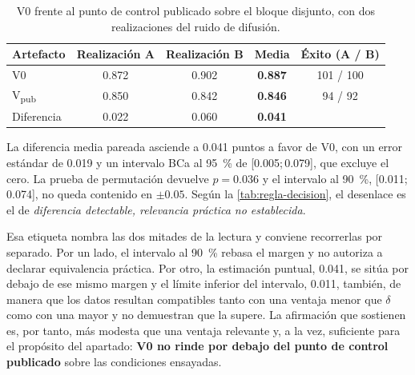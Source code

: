 \begin{table}[htbp]
  \centering
  \caption{V0 frente al punto de control publicado sobre el bloque disjunto, con dos
    realizaciones del ruido de difusi\'on.}
  \label{tab:comparacion-paper}
  \small
  \scriptsize
  \begin{tabular}{lccc c}
    \toprule
    Artefacto & Realizaci\'on A & Realizaci\'on B & Media & \'Exito (A / B) \\
    \midrule
    V0                  & \num{0.872} & \num{0.902} & \textbf{\num{0.887}} &
      \num{101} / \num{100} \\
    V\textsubscript{pub} & \num{0.850} & \num{0.842} & \textbf{\num{0.846}} &
      \num{94} / \num{92} \\
    \midrule
    Diferencia & \num{0.022} & \num{0.060} & \textbf{\num{0.041}} & \\
    \bottomrule
  \end{tabular}
\end{table}

La diferencia media pareada asciende a \num{0.041} puntos a favor de V0, con un error
est\'andar de \num{0.019} y un intervalo BCa al \SI{95}{\percent} de
{[\num{0.005};\,\num{0.079}]}, que excluye el cero. La prueba de permutaci\'on devuelve
$p = \num{0.036}$ y el intervalo al \SI{90}{\percent}, {[\num{0.011};\,\num{0.074}]}, no
queda contenido en $\pm\num{0.05}$. Seg\'un la \cref{tab:regla-decision}, el desenlace es el
de \emph{diferencia detectable, relevancia pr\'actica no establecida}.

Esa etiqueta nombra las dos mitades de la lectura y conviene recorrerlas por separado. Por un
lado, el intervalo al \SI{90}{\percent} rebasa el margen y no autoriza a declarar
equivalencia pr\'actica. Por otro, la estimaci\'on puntual, \num{0.041}, se sit\'ua por
debajo de ese mismo margen y el l\'imite inferior del intervalo, \num{0.011}, tambi\'en, de
manera que los datos resultan compatibles tanto con una ventaja menor que $\delta$ como con
una mayor y no demuestran que la supere. La afirmaci\'on que sostienen es, por tanto, m\'as
modesta que una ventaja relevante y, a la vez, suficiente para el prop\'osito del apartado:
\textbf{V0 no rinde por debajo del punto de control publicado} sobre las condiciones
ensayadas.

